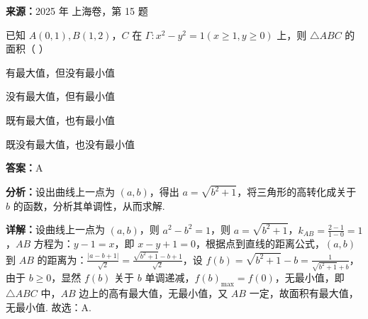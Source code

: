 \begin{question}[points=5]
\textbf{来源：}2025 年 上海卷，第 15 题\par
已知 $A(0,1), B(1,2)$，$C$ 在 $\Gamma: x^2 - y^2 = 1 (x \geq 1, y \geq 0)$ 上，则 $\triangle ABC$ 的面积（ ）
\begin{choices}
  \item 有最大值，但没有最小值
  \item 没有最大值，但有最小值
  \item 既有最大值，也有最小值
  \item 既没有最大值，也没有最小值
\end{choices}
\begin{solution}
\textbf{答案：}A

\textbf{分析：}设出曲线上一点为 $(a, b)$，得出 $a = \sqrt{b^2 + 1}$，将三角形的高转化成关于 $b$ 的函数，分析其单调性，从而求解.

\textbf{详解：}设曲线上一点为 $(a, b)$，则 $a^2 - b^2 = 1$，则 $a = \sqrt{b^2 + 1}$，$k_{AB} = \frac{2-1}{1-0} = 1$，$AB$ 方程为：$y-1 = x$，即 $x - y + 1 = 0$，根据点到直线的距离公式，$(a, b)$ 到 $AB$ 的距离为：$\frac{|a - b + 1|}{\sqrt{2}} = \frac{\sqrt{b^2 + 1} - b + 1}{\sqrt{2}}$，设 $f(b) = \sqrt{b^2 + 1} - b = \frac{1}{\sqrt{b^2 + 1} + b}$，由于 $b \geq 0$，显然 $f(b)$ 关于 $b$ 单调递减，$f(b)_{\max} = f(0)$，无最小值，即 $\triangle ABC$ 中，$AB$ 边上的高有最大值，无最小值，又 $AB$ 一定，故面积有最大值，无最小值. 故选：A.
\end{solution}
\end{question}

